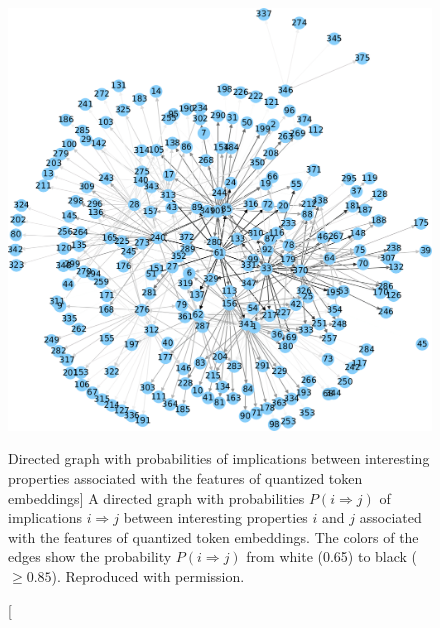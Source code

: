 \begin{figure}
\includegraphics{word2bits-implications}
\vspace{-0.5cm}
\caption
  [Directed graph with probabilities of implications between interesting
   properties associated with the features of quantized token embeddings]%
  {A directed graph with probabilities $P(i ⇒ j)$ of implications $i ⇒ j$
   between interesting properties $i$ and $j$ associated with the features
   of quantized token embeddings. The colors of the edges show the probability
   $P(i ⇒ j)$ from white (0.65) to black ($≥ 0.85$).
   Reproduced with permission. \cite[Figure B.1]{stefanik2019semantic}}
\label{fig:formal-concept-analysis-with-quantized-token-embeddings}
\end{figure}

